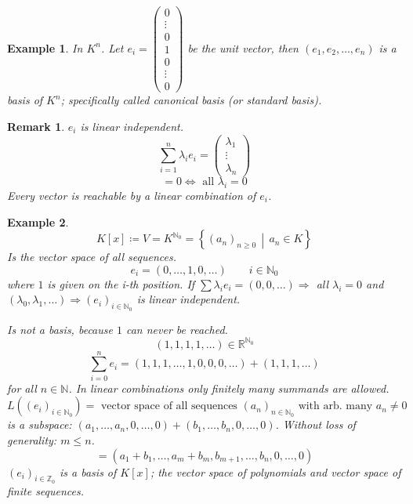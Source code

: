 \documentclass[a4paper,landscape,twocolumn]{article}
\newcommand\setdef[2]{\left\{#1\,\middle|\,#2\right\}}
\newtheorem{ex}{Example}
\newtheorem{rem}{Remark}
\begin{document}
\begin{ex}
  In $K^n$.
  Let $e_i = \begin{pmatrix} 0 \\ \vdots \\ 0 \\ 1 \\ 0 \\ \vdots \\ 0 \end{pmatrix}$ be the unit vector,
  then $(e_1, e_2, \ldots, e_n)$ is a basis of $K^n$; specifically called \emph{canonical basis} (or \emph{standard basis}).
\end{ex}

\begin{rem}
  $e_i$ is linear independent.
  \[
      \sum_{i=1}^n \lambda_i e_i
      = \begin{pmatrix} \lambda_1 \\ \vdots \\ \lambda_n \end{pmatrix}
  \]
  \[ = 0 \Leftrightarrow \text{ all } \lambda_i = 0 \]
  Every vector is reachable by a linear combination of $e_i$.
\end{rem}

\begin{ex}
  \[ K[x] \coloneqq V = K^{\mathbb N_0} = \setdef{(a_n)_{n \geq 0}}{a_n \in K} \]
  Is the vector space of all sequences.
  \[ e_i = (0, \ldots, 1, 0, \ldots) \qquad i \in \mathbb N_0 \]
  where $1$ is given on the i-th position.
  If $\sum \lambda_i e_i = (0, 0, \ldots) \Rightarrow$  all $\lambda_i = 0$
  and $(\lambda_0, \lambda_1, \ldots) \Rightarrow (e_i)_{i \in \mathbb N_0}$ is linear independent.

  Is not a basis, because $1$ can never be reached.
  \[ (1, 1, 1, 1, \ldots) \in \mathbb R^{\mathbb N_0} \]
  \[ \sum_{i=0}^n e_i = (1, 1, 1, \ldots, 1, 0, 0, 0, \ldots) + (1, 1, 1, \ldots) \]
  for all $n \in \mathbb N$. In linear combinations only finitely many summands are allowed.
  \[ L\left((e_i)_{i \in \mathbb N_0}\right) = \text{ vector space of all sequences } (a_n)_{n \in \mathbb N_0} \text{ with arb. many } a_n \neq 0 \]
  is a subspace: $(a_1, \ldots, a_n, 0, \ldots, 0) + (b_1, \ldots, b_n, 0, \ldots, 0)$.
  Without loss of generality: $m \leq n$.
  \[ = (a_1 + b_1, \ldots, a_m + b_m, b_{m+1}, \ldots, b_n, 0, \ldots, 0) \]
  $(e_i)_{i \in \mathbb Z_0}$ is a basis of $K[x]$; the vector space of polynomials and vector space of finite sequences.
\end{ex}
\end{document}
